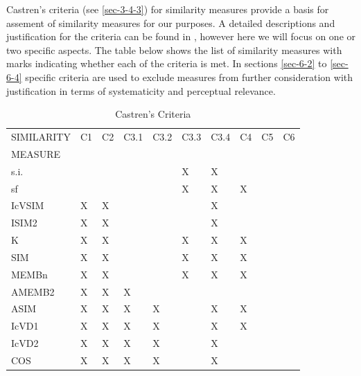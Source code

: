 \documentclass{article}
\begin{document}
Castren's criteria (see \ref{sec-3-4-3}) for similarity measures
provide a basis for assement of similarity measures for our
purposes. A detailed descriptions and justification for the criteria
can be found in \citet[chap. 2]{Castren1994}, however here we will
focus on one or two specific aspects. The table below shows the list
of similarity measures with marks indicating whether each of the
criteria is met. In sections \ref{sec-6-2} to \ref{sec-6-4} specific
criteria are used to exclude measures from further consideration with
justification in terms of systematicity and perceptual relevance.
\begin{table}[htb]
\caption{Castren's Criteria} 
\begin{center}
\begin{tabular}{llllllllll}
\hline
 SIMILARITY  &  C1  &  C2  &  C3.1  &  C3.2  &  C3.3  &  C3.4  &  C4  &  C5  &  C6  \\
 MEASURE     &      &      &        &        &        &        &      &      &      \\
\hline
 s.i.        &      &      &        &        &  X     &  X     &      &      &      \\
 sf          &      &      &        &        &  X     &  X     &  X   &      &      \\
 IcVSIM      &  X   &  X   &        &        &        &  X     &      &      &      \\
 ISIM2       &  X   &  X   &        &        &        &  X     &      &      &      \\
 K           &  X   &  X   &        &        &  X     &  X     &  X   &      &      \\
 SIM         &  X   &  X   &        &        &  X     &  X     &  X   &      &      \\
 MEMBn       &  X   &  X   &        &        &  X     &  X     &  X   &      &      \\
 AMEMB2      &  X   &  X   &  X     &        &        &        &      &      &      \\
 ASIM        &  X   &  X   &  X     &  X     &        &  X     &  X   &      &      \\
 IcVD1       &  X   &  X   &  X     &  X     &        &  X     &  X   &      &      \\
 IcVD2       &  X   &  X   &  X     &  X     &        &  X     &      &      &      \\
 COS         &  X   &  X   &  X     &  X     &        &  X     &      &      &      \\

\end{tabular}
\end{center}
\end{table}
\end{document}
